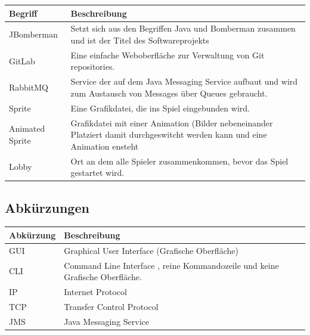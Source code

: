 \documentclass[11pt]{scrartcl}
\begin{document}
\begin{tabularx}{\linewidth}{l | X}
    \textbf{Begriff} & \textbf{Beschreibung}\\
    \hline
    JBomberman & Setzt sich aus den Begriffen Java und Bomberman zusammen und ist der Titel des Softwareprojekts\\
    \hline
    GitLab & Eine einfache Weboberfläche zur Verwaltung von Git repositories.\\
    \hline
    RabbitMQ & Service der auf dem Java Messaging Service aufbaut und wird zum Austausch von Messages über Queues gebraucht.\\
    \hline
    Sprite & Eine Grafikdatei, die ins Spiel eingebunden wird.\\
    \hline
    Animated Sprite & Grafikdatei mit einer Animation (Bilder nebeneinander Platziert damit durchgeswitcht werden kann und eine Animation ensteht\\
    \hline
    Lobby & Ort an dem alle Spieler zusammenkommen, bevor das Spiel gestartet wird.\\
    
\end{tabularx}

\subsection{Abkürzungen}
\begin{tabularx}{\linewidth}{l | X}
    \textbf{Abkürzung} & \textbf{Beschreibung}\\
    \hline
    GUI & Graphical User Interface (Grafische Oberfläche)\\
    \hline
    CLI & Command Line Interface  , reine Kommandozeile und keine Grafische Oberfläche.\\
    \hline 
    IP & Internet Protocol\\
    \hline
    TCP & Transfer Control Protocol\\
    \hline
    JMS & Java Messaging Service\\
\end{tabularx}
\end{document}
